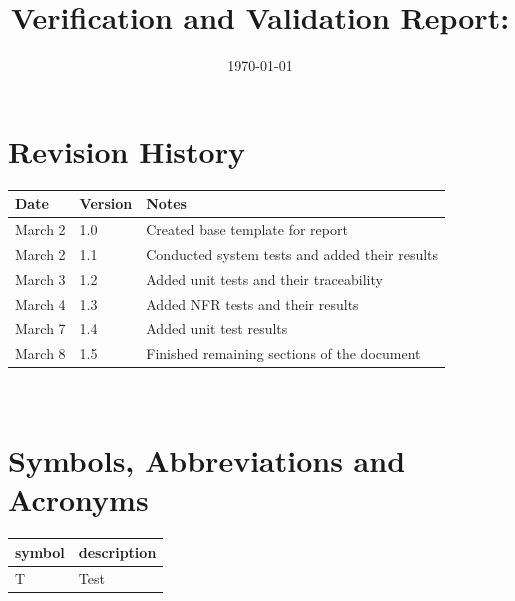 \documentclass[12pt, titlepage]{article}
\begin{document}
	
	\title{Verification and Validation Report: \progname} 
	\author{\authname}
	\date{\today}
	
	
	
	\section{Revision History}
	
	\begin{tabularx}{\textwidth}{p{3cm}p{2cm}X}
		\toprule {\bf Date} & {\bf Version} & {\bf Notes}\\
		\midrule
		March 2 & 1.0 & Created base template for report\\
		March 2 & 1.1 & Conducted system tests and added their results\\
		March 3 & 1.2 & Added unit tests and their traceability\\
		March 4 & 1.3 & Added NFR tests and their results \\
		March 7 & 1.4 & Added unit test results \\
		March 8 & 1.5 & Finished remaining sections of the document \\
		\bottomrule
	\end{tabularx}
	
	~\newpage
	
	\section{Symbols, Abbreviations and Acronyms}
	
	\renewcommand{\arraystretch}{1.2}
	\begin{tabular}{l l} 
		\toprule		
		\textbf{symbol} & \textbf{description}\\
		\midrule 
		T & Test\\
		\bottomrule
	\end{tabular}\\
	
	
	\newpage
	
	\tableofcontents
	
	\listoftables %
	
	\listoffigures %
	
\end{document}
